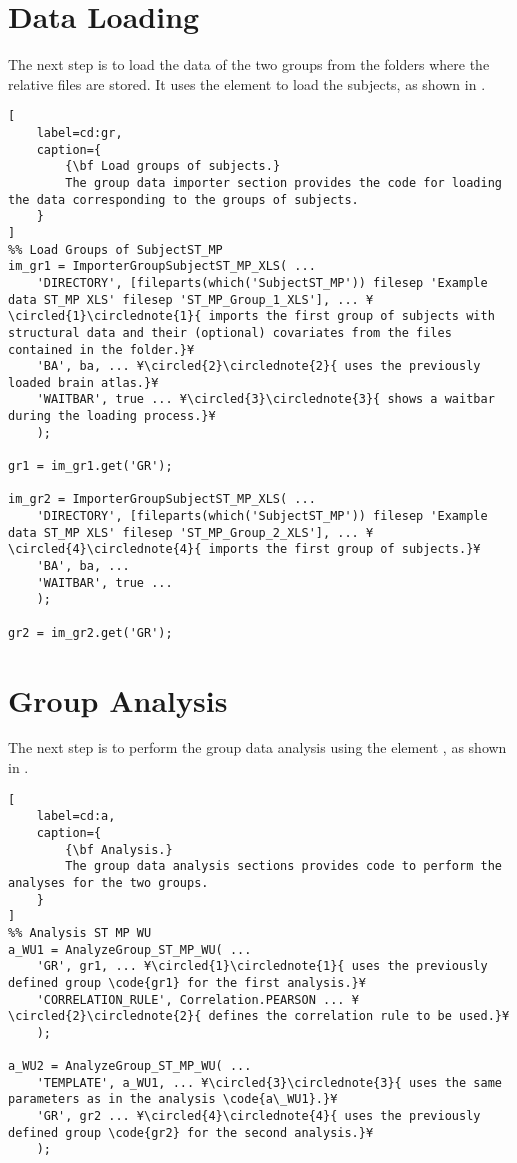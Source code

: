 \documentclass{tufte-handout}
\begin{document}
\section{Data Loading}

The next step is to load the data of the two groups from the folders where the relative  files are stored. It uses the element  to load the  subjects, as shown in .

\begin{lstlisting}[
	label=cd:gr,
	caption={
		{\bf Load groups of subjects.}
		The group data importer section provides the code for loading the data corresponding to the groups of subjects.
	}
]
%% Load Groups of SubjectST_MP
im_gr1 = ImporterGroupSubjectST_MP_XLS( ...
    'DIRECTORY', [fileparts(which('SubjectST_MP')) filesep 'Example data ST_MP XLS' filesep 'ST_MP_Group_1_XLS'], ... ¥\circled{1}\circlednote{1}{ imports the first group of subjects with structural data and their (optional) covariates from the files contained in the folder.}¥
    'BA', ba, ... ¥\circled{2}\circlednote{2}{ uses the previously loaded brain atlas.}¥
    'WAITBAR', true ... ¥\circled{3}\circlednote{3}{ shows a waitbar during the loading process.}¥
    );

gr1 = im_gr1.get('GR');

im_gr2 = ImporterGroupSubjectST_MP_XLS( ...
    'DIRECTORY', [fileparts(which('SubjectST_MP')) filesep 'Example data ST_MP XLS' filesep 'ST_MP_Group_2_XLS'], ... ¥\circled{4}\circlednote{4}{ imports the first group of subjects.}¥
    'BA', ba, ...
    'WAITBAR', true ...
    );

gr2 = im_gr2.get('GR');

\end{lstlisting}

\section{Group Analysis}

The next step is to perform the group data analysis using the element \code{}, as shown in .

\begin{lstlisting}[
	label=cd:a,
	caption={
		{\bf Analysis.}
		The group data analysis sections provides code to perform the analyses for the two groups.
	}
]
%% Analysis ST MP WU
a_WU1 = AnalyzeGroup_ST_MP_WU( ...
    'GR', gr1, ... ¥\circled{1}\circlednote{1}{ uses the previously defined group \code{gr1} for the first analysis.}¥
    'CORRELATION_RULE', Correlation.PEARSON ... ¥\circled{2}\circlednote{2}{ defines the correlation rule to be used.}¥
    );

a_WU2 = AnalyzeGroup_ST_MP_WU( ...
    'TEMPLATE', a_WU1, ... ¥\circled{3}\circlednote{3}{ uses the same parameters as in the analysis \code{a\_WU1}.}¥
    'GR', gr2 ... ¥\circled{4}\circlednote{4}{ uses the previously defined group \code{gr2} for the second analysis.}¥
    );

\end{lstlisting}
\end{document}

